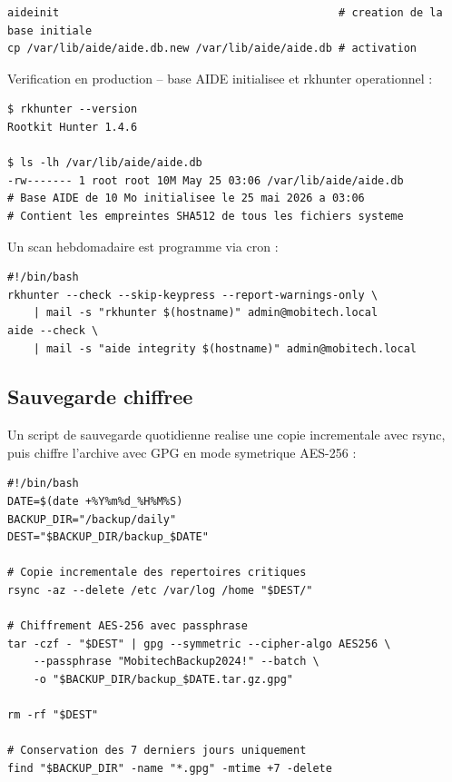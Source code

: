 \documentclass[11pt,a4paper]{article}
\begin{document}
\begin{lstlisting}[caption={Initialisation de la base AIDE}]
aideinit                                           # creation de la base initiale
cp /var/lib/aide/aide.db.new /var/lib/aide/aide.db # activation
\end{lstlisting}

Verification en production -- base AIDE initialisee et rkhunter operationnel :

\begin{lstlisting}[caption={Sortie reelle -- verification rkhunter et aide sur AD-LDAP}]
$ rkhunter --version
Rootkit Hunter 1.4.6

$ ls -lh /var/lib/aide/aide.db
-rw------- 1 root root 10M May 25 03:06 /var/lib/aide/aide.db
# Base AIDE de 10 Mo initialisee le 25 mai 2026 a 03:06
# Contient les empreintes SHA512 de tous les fichiers systeme
\end{lstlisting}

Un scan hebdomadaire est programme via cron :

\begin{lstlisting}[caption={/etc/cron.weekly/security-scan}]
#!/bin/bash
rkhunter --check --skip-keypress --report-warnings-only \
    | mail -s "rkhunter $(hostname)" admin@mobitech.local
aide --check \
    | mail -s "aide integrity $(hostname)" admin@mobitech.local
\end{lstlisting}

\subsection{Sauvegarde chiffree}

Un script de sauvegarde quotidienne realise une copie incrementale avec rsync, puis chiffre l'archive avec GPG en mode symetrique AES-256 :

\begin{lstlisting}[caption={/usr/local/bin/backup\_mobitech.sh}]
#!/bin/bash
DATE=$(date +%Y%m%d_%H%M%S)
BACKUP_DIR="/backup/daily"
DEST="$BACKUP_DIR/backup_$DATE"

# Copie incrementale des repertoires critiques
rsync -az --delete /etc /var/log /home "$DEST/"

# Chiffrement AES-256 avec passphrase
tar -czf - "$DEST" | gpg --symmetric --cipher-algo AES256 \
    --passphrase "MobitechBackup2024!" --batch \
    -o "$BACKUP_DIR/backup_$DATE.tar.gz.gpg"

rm -rf "$DEST"

# Conservation des 7 derniers jours uniquement
find "$BACKUP_DIR" -name "*.gpg" -mtime +7 -delete
\end{lstlisting}
\end{document}
